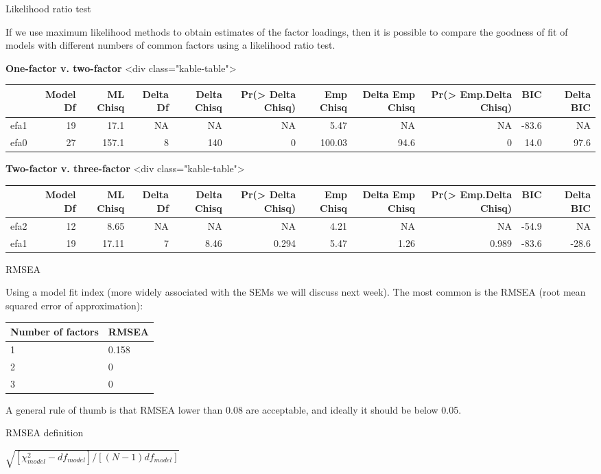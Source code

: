 \documentclass[10pt,ignorenonframetext,]{beamer}
\begin{document}
\begin{frame}{Likelihood ratio test}

If we use maximum likelihood methods to obtain estimates of the factor
loadings, then it is possible to compare the goodness of fit of models
with different numbers of common factors using a likelihood ratio test.

\textbf{One-factor v. two-factor} \tiny
<div class="kable-table">

\begin{longtable}[]{@{}lrrrrrrrrrr@{}}
\toprule
& Model Df & ML Chisq & Delta Df & Delta Chisq & Pr(\textgreater{} Delta
Chisq) & Emp Chisq & Delta Emp Chisq & Pr(\textgreater{} Emp.Delta
Chisq) & BIC & Delta BIC\tabularnewline
\midrule
\endhead
efa1 & 19 & 17.1 & NA & NA & NA & 5.47 & NA & NA & -83.6 &
NA\tabularnewline
efa0 & 27 & 157.1 & 8 & 140 & 0 & 100.03 & 94.6 & 0 & 14.0 &
97.6\tabularnewline
\bottomrule
\end{longtable}

\normalsize

\textbf{Two-factor v. three-factor} \tiny
<div class="kable-table">

\begin{longtable}[]{@{}lrrrrrrrrrr@{}}
\toprule
& Model Df & ML Chisq & Delta Df & Delta Chisq & Pr(\textgreater{} Delta
Chisq) & Emp Chisq & Delta Emp Chisq & Pr(\textgreater{} Emp.Delta
Chisq) & BIC & Delta BIC\tabularnewline
\midrule
\endhead
efa2 & 12 & 8.65 & NA & NA & NA & 4.21 & NA & NA & -54.9 &
NA\tabularnewline
efa1 & 19 & 17.11 & 7 & 8.46 & 0.294 & 5.47 & 1.26 & 0.989 & -83.6 &
-28.6\tabularnewline
\bottomrule
\end{longtable}

\end{frame}

\begin{frame}{RMSEA}

Using a model fit index (more widely associated with the SEMs we will
discuss next week). The most common is the RMSEA (root mean squared
error of approximation):

\begin{longtable}[]{@{}ll@{}}
\toprule
Number of factors & RMSEA\tabularnewline
\midrule
\endhead
1 & 0.158\tabularnewline
2 & 0\tabularnewline
3 & 0\tabularnewline
\bottomrule
\end{longtable}

A general rule of thumb is that RMSEA lower than 0.08 are acceptable,
and ideally it should be below 0.05.

\begin{block}{RMSEA definition}

\(\sqrt{[\chi^2_{model} - df_{model}]/[(N - 1) df_{model}]}\)

\end{block}

\end{frame}
\end{document}
